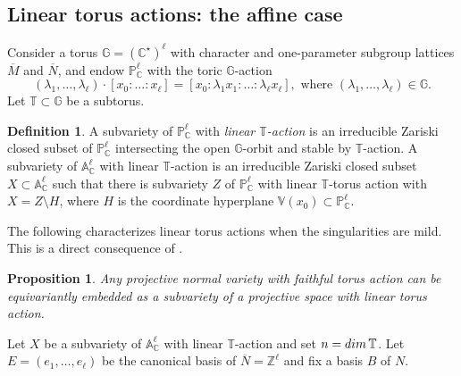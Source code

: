 \documentclass[11pt, reqno]{amsart}
\theoremstyle{plain}
\newtheorem{proposition}[theorem]{Proposition}
\theoremstyle{definition}
\newtheorem{definition}[theorem]{Definition}
\theoremstyle{remark}
\begin{document}
\subsection{Linear torus actions: the affine case}
Consider a torus $\mathbb{G} =  (\mathbb{C}^{\star})^{\ell}$ with character and 
one-parameter subgroup lattices $\overline{M}$ and $\overline{N}$, and endow
$\mathbb{P}_{\mathbb{C}}^{\ell}$ with the toric $\mathbb{G}$-action
$$(\lambda_{1}, \ldots, \lambda_{\ell})\cdot [x_{0}: \ldots: x_{\ell}] = [x_{0}:\lambda_{1} x_{1}: \ldots :\lambda_{\ell}x_{\ell}],\text{ where }(\lambda_{1}, \ldots, \lambda_{\ell})\in \mathbb{G}.$$ Let $\mathbb{T}\subset \mathbb{G}$ be a subtorus.
\begin{definition}\label{def-suvbvarinv}
A subvariety of $\mathbb{P}_{\mathbb{C}}^{\ell}$ with \emph{linear $\mathbb{T}$-action} is an irreducible Zariski closed subset of $\mathbb{P}_{\mathbb{C}}^{\ell}$ intersecting the open $\mathbb{G}$-orbit and stable by $\mathbb{T}$-action.
A subvariety of $\mathbb{A}_{\mathbb{C}}^{\ell}$ with linear $\mathbb{T}$-action is an  irreducible Zariski closed subset $X\subset \mathbb{A}_{\mathbb{C}}^{\ell}$ such that there is subvariety $Z$ of  $\mathbb{P}_{\mathbb{C}}^{\ell}$ with linear $\mathbb{T}$-torus action with $X  =  Z\setminus H$, where $H$ is the coordinate hyperplane $\mathbb{V}(x_{0})\subset \mathbb{P}_{\mathbb{C}}^{\ell}$. 
\end{definition}
The following characterizes linear torus actions when the singularities are mild. This is a direct consequence of \cite[Proposition 2.4]{KKLV89}.
\begin{proposition} 
Any projective normal variety with faithful torus action can be equivariantly embedded as a subvariety of a projective space with linear torus action.
\end{proposition}
Let $X$ be a subvariety of $\mathbb{A}^{\ell}_{\mathbb{C}}$ with linear $\mathbb{T}$-action and set $n =  {\rm dim}\, \mathbb{T}$.
Let $E =  (e_{1}, \ldots, e_{\ell})$ be the canonical basis of $\overline{N} =  \mathbb{Z}^{\ell}$ and fix a basis $B$ of $N$. 
\end{document}
